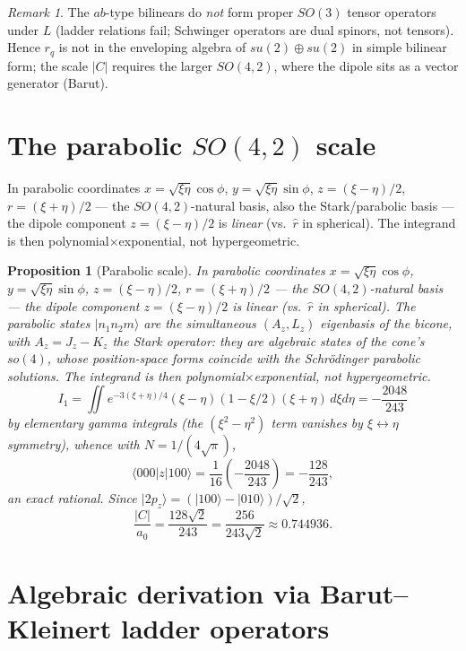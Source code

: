 \documentclass[11pt]{amsart}
\newtheorem{proposition}[theorem]{Proposition}
\theoremstyle{remark}
\newtheorem*{remark}{Remark}
\begin{document}
\begin{remark}
The $ab$-type bilinears do \emph{not} form proper $SO(3)$ tensor
operators under $L$ (ladder relations fail; Schwinger operators are
dual spinors, not tensors).  Hence $r_q$ is not in the enveloping
algebra of $su(2)\oplus su(2)$ in simple bilinear form; the scale
$|C|$ requires the larger $SO(4,2)$, where the dipole sits as a vector
generator (Barut).
\end{remark}

\section{The parabolic $SO(4,2)$ scale}

In parabolic coordinates
$x=\sqrt{\xi\eta}\cos\phi$, $y=\sqrt{\xi\eta}\sin\phi$,
$z=(\xi-\eta)/2$, $r=(\xi+\eta)/2$ --- the $SO(4,2)$-natural basis, also
the Stark/parabolic basis --- the dipole component $z=(\xi-\eta)/2$ is
\emph{linear} (vs.\ $\hat r$ in spherical).  The integrand is then
polynomial$\times$exponential, not hypergeometric.

\begin{proposition}[Parabolic scale]
In parabolic coordinates
$x=\sqrt{\xi\eta}\cos\phi$, $y=\sqrt{\xi\eta}\sin\phi$,
$z=(\xi-\eta)/2$, $r=(\xi+\eta)/2$ --- the $SO(4,2)$-natural basis ---
the dipole component $z=(\xi-\eta)/2$ is \emph{linear} (vs.\ $\hat r$
in spherical).  The parabolic states $|n_1n_2m\rangle$ are the
simultaneous $(A_z,L_z)$ eigenbasis of the bicone, with
$A_z=J_z-K_z$ the Stark operator: they are algebraic states of the
cone's $so(4)$, whose position-space forms coincide with the
Schr\"odinger parabolic solutions.  The integrand is then
polynomial$\times$exponential, not hypergeometric.
\[
I_1=\iint e^{-3(\xi+\eta)/4}(\xi-\eta)(1-\xi/2)(\xi+\eta)\,d\xi d\eta
=-\frac{2048}{243}
\]
by elementary gamma integrals (the $(\xi^2-\eta^2)$ term vanishes by
$\xi\leftrightarrow\eta$ symmetry), whence with $N=1/(4\sqrt\pi)$,
\[
\langle000|z|100\rangle=\frac{1}{16}\left(-\frac{2048}{243}\right)
=-\frac{128}{243},
\]
an exact rational.  Since $|2p_z\rangle=(|100\rangle-|010\rangle)/\sqrt2$,
\[
\frac{|C|}{a_0}=\frac{128\sqrt2}{243}=\frac{256}{243\sqrt2}
\approx0.744936.
\]
\end{proposition}

\section{Algebraic derivation via Barut--Kleinert ladder operators}
\end{document}
